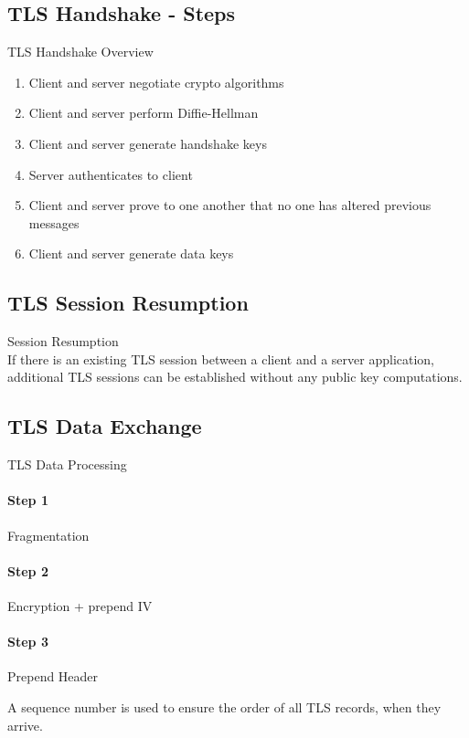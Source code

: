 
\subsection{TLS Handshake - Steps}

\begin{concept}{TLS Handshake Overview}\\
    \begin{enumerate}
        \item Client and server negotiate crypto algorithms
        \item Client and server perform Diffie-Hellman
        \item Client and server generate handshake keys
        \item Server authenticates to client
        \item Client and server prove to one another that no one has altered previous messages
        \item Client and server generate data keys
    \end{enumerate}
\end{concept}

\subsection{TLS Session Resumption}

\begin{concept}{Session Resumption}\\
    If there is an existing TLS session between a client and a server application, additional TLS sessions can be established without any public key computations.
\end{concept}

\subsection{TLS Data Exchange}

\begin{KR}{TLS Data Processing}\\
    \paragraph{Step 1} Fragmentation
    \paragraph{Step 2} Encryption + prepend IV
    \paragraph{Step 3} Prepend Header
    
    A sequence number is used to ensure the order of all TLS records, when they arrive.
\end{KR}

